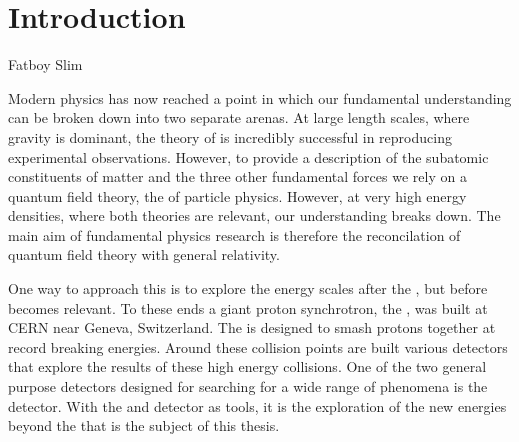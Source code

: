 \chapter{Introduction}
\label{chap:introduction}



{Fatboy Slim}


Modern physics has now reached a point in which our fundamental
understanding can be broken down into two separate arenas. At large
length scales, where gravity is dominant, the theory of \GR is
incredibly successful in reproducing experimental observations.
However, to provide a description of the subatomic constituents of
matter and the three other fundamental forces we rely on a quantum
field theory, the \SM of particle physics. However, at very high
energy densities, where both theories are relevant, our understanding
breaks down. The main aim of fundamental physics research is therefore
the reconcilation of quantum field theory with general relativity. 

One way to approach this is to explore the energy scales after the
\SM, but before \GR becomes relevant. To these ends a giant proton
synchrotron, the \LHC, was built at CERN near Geneva, Switzerland. The
\LHC is designed to smash protons together at record breaking
energies. Around these collision points are built various detectors
that explore the results of these high energy collisions. One of the
two general purpose detectors designed for searching for a wide range
of phenomena is the \CMS detector. With the \LHC and \CMS detector as
tools, it is the exploration of the new energies beyond the \SM that
is the subject of this thesis.

